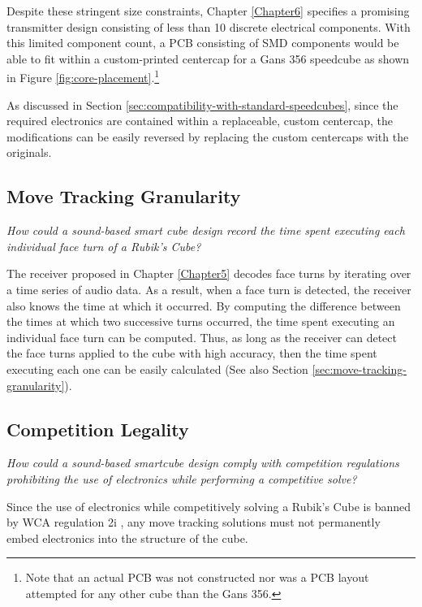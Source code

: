 Despite these stringent size constraints, Chapter \ref{Chapter6}
specifies a promising transmitter design consisting of less than 10
discrete electrical components. With this limited component count, a
PCB consisting of SMD components would be able to fit within a
custom-printed centercap for a Gans 356 speedcube as shown in Figure
\ref{fig:core-placement}.\footnote{Note that an actual PCB was not
constructed nor was a PCB layout attempted for any other cube than the
Gans 356.}

As discussed in Section
\ref{sec:compatibility-with-standard-speedcubes}, since the required
electronics are contained within a replaceable, custom centercap, the
modifications can be easily reversed by replacing the custom centercaps
with the originals.


\subsection{Move Tracking Granularity}
\label{subsec:answer-granularity}

\emph{How could a sound-based smart cube design record the time spent
executing each individual face turn of a Rubik's Cube?}

The receiver proposed in Chapter \ref{Chapter5} decodes face turns by
iterating over a time series of audio data. As a result, when a face
turn is detected, the receiver also knows the time at which it
occurred. By computing the difference between the times at which two
successive turns occurred, the time spent executing an individual face
turn can be computed. Thus, as long as the receiver can detect the face
turns applied to the cube with high accuracy, then the time spent
executing each one can be easily calculated (See also Section
\ref{sec:move-tracking-granularity}).


\subsection{Competition Legality}
\label{subsec:answer-competition-legality}

\emph{How could a sound-based smartcube design comply with competition
regulations prohibiting the use of electronics while performing a
competitive solve?}

Since the use of electronics while competitively solving a Rubik's Cube
is banned by WCA regulation 2i \cite{wca-regulations}, any move
tracking solutions must not permanently embed electronics into the
structure of the cube.

